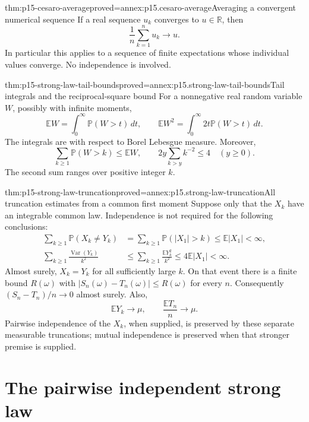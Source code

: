 \begin{hblemma}{thm:p15-cesaro-average}{proved=annex:p15.cesaro-average}{Averaging a convergent numerical sequence}
If a real sequence \(u_k\) converges to \(u\in\mathbb R\), then
\[
 \frac1n\sum_{k=1}^nu_k\longrightarrow u.
\]
In particular this applies to a sequence of finite expectations whose
individual values converge. No independence is involved.
\end{hblemma}

\begin{hblemma}{thm:p15-strong-law-tail-bounds}{proved=annex:p15.strong-law-tail-bounds}{Tail integrals and the reciprocal-square bound}
For a nonnegative real random variable \(W\), possibly with infinite
moments,
\[
 \mathbb EW=\int_0^\infty\mathbb P(W>t)\,dt,
 \qquad
 \mathbb EW^2=\int_0^\infty2t\mathbb P(W>t)\,dt.
\]
The integrals are with respect to Borel Lebesgue measure. Moreover,
\[
 \sum_{k\geq1}\mathbb P(W>k)\leq\mathbb EW,
 \qquad
 2y\sum_{k>y}k^{-2}\leq4\quad(y\geq0).
\]
The second sum ranges over positive integer \(k\).
\end{hblemma}

\begin{hbtheorem}{thm:p15-strong-law-truncation}{proved=annex:p15.strong-law-truncation}{All truncation estimates from a common first moment}
Suppose only that the \(X_k\) have an integrable common law.
Independence is not required for the following conclusions:
\[
 \begin{aligned}
 \sum_{k\geq1}\mathbb P(X_k\ne Y_k)
       &=\sum_{k\geq1}\mathbb P(|X_1|>k)
                      \leq\mathbb E|X_1|<\infty,\\
 \sum_{k\geq1}\frac{\operatorname{Var}(Y_k)}{k^2}
       &\leq\sum_{k\geq1}\frac{\mathbb EY_k^2}{k^2}
                      \leq4\mathbb E|X_1|<\infty.
 \end{aligned}
\]
Almost surely, \(X_k=Y_k\) for all sufficiently large \(k\).
On that event there is a finite bound \(R(\omega)\) with
\(|S_n(\omega)-T_n(\omega)|\leq R(\omega)\) for every \(n\).
Consequently \((S_n-T_n)/n\to0\) almost surely. Also,
\[
 \mathbb EY_k\longrightarrow\mu,
 \qquad
 \frac{\mathbb ET_n}{n}\longrightarrow\mu.
\]
Pairwise independence of the \(X_k\), when supplied, is preserved
by these separate measurable truncations; mutual independence is
preserved when that stronger premise is supplied.
\end{hbtheorem}

\section{The pairwise independent strong law}
\label{sec:p15-pairwise-strong-law}

